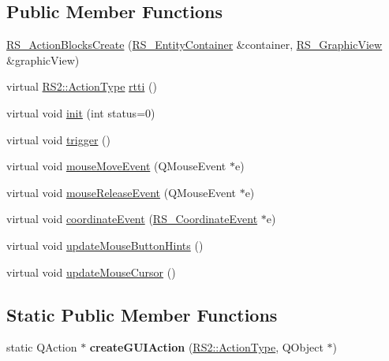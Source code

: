 \subsection*{Public Member Functions}
\begin{DoxyCompactItemize}
\item 
\hyperlink{classRS__ActionBlocksCreate_ad2815e3258f2c4a8f3da87da393490da}{R\-S\-\_\-\-Action\-Blocks\-Create} (\hyperlink{classRS__EntityContainer}{R\-S\-\_\-\-Entity\-Container} \&container, \hyperlink{classRS__GraphicView}{R\-S\-\_\-\-Graphic\-View} \&graphic\-View)
\item 
virtual \hyperlink{classRS2_afe3523e0bc41fd637b892321cfc4b9d7}{R\-S2\-::\-Action\-Type} \hyperlink{classRS__ActionBlocksCreate_a4652678f3294c5d765b9964cd4316eef}{rtti} ()
\item 
virtual void \hyperlink{classRS__ActionBlocksCreate_aac414b60f1b82ffbd5511194127a7bf9}{init} (int status=0)
\item 
virtual void \hyperlink{classRS__ActionBlocksCreate_ac8e647cb693c017f4168cf4d3445a0e9}{trigger} ()
\item 
virtual void \hyperlink{classRS__ActionBlocksCreate_af18add95f2dbc72bb77eab3223d6a1bb}{mouse\-Move\-Event} (Q\-Mouse\-Event $\ast$e)
\item 
virtual void \hyperlink{classRS__ActionBlocksCreate_af1e0e7b9d3a09b5bba3c3f885304e0db}{mouse\-Release\-Event} (Q\-Mouse\-Event $\ast$e)
\item 
virtual void \hyperlink{classRS__ActionBlocksCreate_a32a3fbd555dccc02c269bca46b6281dc}{coordinate\-Event} (\hyperlink{classRS__CoordinateEvent}{R\-S\-\_\-\-Coordinate\-Event} $\ast$e)
\item 
virtual void \hyperlink{classRS__ActionBlocksCreate_a72b9d07deb2bab1997947c416625e531}{update\-Mouse\-Button\-Hints} ()
\item 
virtual void \hyperlink{classRS__ActionBlocksCreate_a135997380da76b05d30cb36d6024e249}{update\-Mouse\-Cursor} ()
\end{DoxyCompactItemize}
\subsection*{Static Public Member Functions}
\begin{DoxyCompactItemize}
\item 
\hypertarget{classRS__ActionBlocksCreate_a551e7345cc87bac65b3d60373934d4ff}{static Q\-Action $\ast$ {\bfseries create\-G\-U\-I\-Action} (\hyperlink{classRS2_afe3523e0bc41fd637b892321cfc4b9d7}{R\-S2\-::\-Action\-Type}, Q\-Object $\ast$)}\label{classRS__ActionBlocksCreate_a551e7345cc87bac65b3d60373934d4ff}

\end{DoxyCompactItemize}
